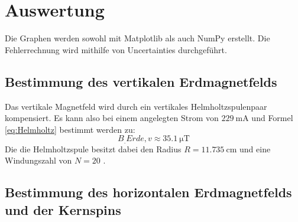 \section{Auswertung}
\label{sec:Auswertung}

Die Graphen werden sowohl mit Matplotlib \cite{matplotlib} als auch NumPy \cite{numpy} erstellt. Die Fehlerrechnung wird mithilfe von Uncertainties \cite{uncertainties} durchgeführt.

\subsection{Bestimmung des vertikalen Erdmagnetfelds}

Das vertikale Magnetfeld wird durch ein vertikales Helmholtzspulenpaar kompensiert. Es kann also bei einem angelegten Strom von $\SI{229}{\milli\ampere}$ und Formel \ref{eq:Helmholtz} bestimmt werden zu:
\[
B_.{Erde,v} \approx \SI{35.1}{\micro\tesla}
\]
Die die Helmholtzspule besitzt dabei den Radius $R=\SI{11,735}{\centi\metre}$ und eine Windungszahl von $N=20$ \cite{V21}.

\subsection{Bestimmung des horizontalen Erdmagnetfelds und der Kernspins}

